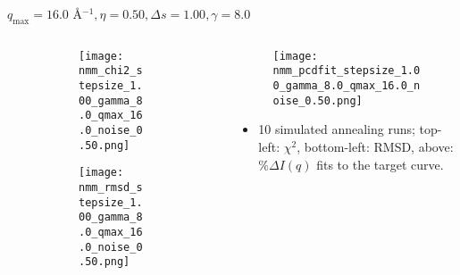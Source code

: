 \documentclass{beamer}
\begin{document}
\begin{frame}{$ q_{\textrm{max}}=16.0 $ \AA $^{-1}, \eta=0.50, \Delta s=1.00, \gamma=8.0$}
	\begin{columns}
		\begin{column}{.5\textwidth}
			\begin{figure}[H]
			\centering
			\begin{subfigure}[b]{\textwidth}
				\centering
				\texttt{[image: nmm\_chi2\_stepsize\_1.00\_gamma\_8.0\_qmax\_16.0\_noise\_0.50.png]}
				\label{fig:}
			\end{subfigure}
			\begin{subfigure}[b]{\textwidth}
				\centering
				\texttt{[image: nmm\_rmsd\_stepsize\_1.00\_gamma\_8.0\_qmax\_16.0\_noise\_0.50.png]}
				\label{fig:}
			\end{subfigure}
			\end{figure}
		\end{column}
		\begin{column}{.5\textwidth}
			\begin{figure}[H]
				\centering
				\texttt{[image: nmm\_pcdfit\_stepsize\_1.00\_gamma\_8.0\_qmax\_16.0\_noise\_0.50.png]}
				\label{fig:}
			\end{figure}
			\begin{itemize}
				\item 10 simulated annealing runs; top-left: $\chi^2$, bottom-left: RMSD, above: $\%\Delta I(q)$ fits to the target curve.
			\end{itemize}
		\end{column}
	\end{columns}
\end{frame}
\end{document}
